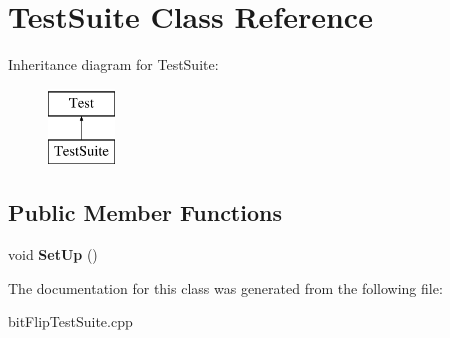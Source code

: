 \hypertarget{class_test_suite}{}\section{Test\+Suite Class Reference}
\label{class_test_suite}
Inheritance diagram for Test\+Suite\+:\begin{figure}[H]
\begin{center}
\leavevmode
\includegraphics[height=2.000000cm]{class_test_suite}
\end{center}
\end{figure}
\subsection*{Public Member Functions}
\begin{DoxyCompactItemize}
\item 
\mbox{\label{class_test_suite_a9196b2d0014a3837c8532c55feadeadf}} 
void {\bfseries Set\+Up} ()
\end{DoxyCompactItemize}


The documentation for this class was generated from the following file\+:\begin{DoxyCompactItemize}
\item 
bit\+Flip\+Test\+Suite.\+cpp\end{DoxyCompactItemize}
